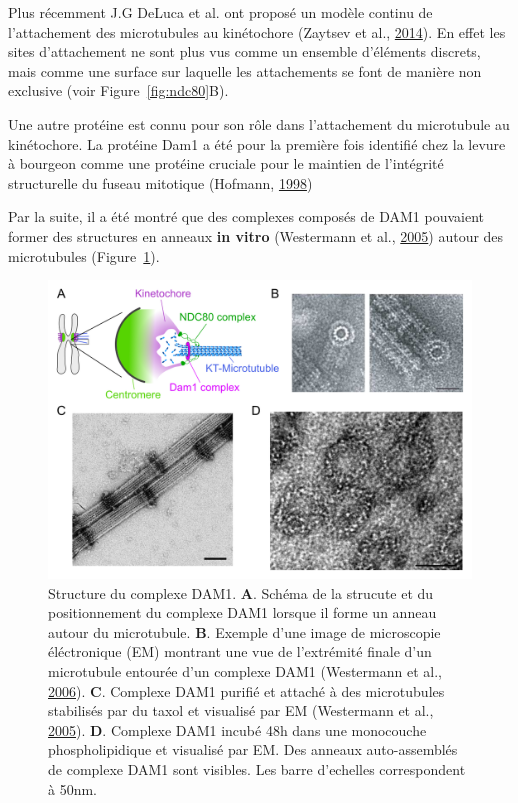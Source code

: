 \documentclass[12pt,a4paper,twoside,openright]{book}
\begin{document}
Plus récemment J.G DeLuca et al. ont proposé un modèle continu de
l'attachement des microtubules au kinétochore (Zaytsev et al.,
\protect\hyperlink{ref-Zaytsev2014}{2014}). En effet les sites
d'attachement ne sont plus vus comme un ensemble d'éléments discrets,
mais comme une surface sur laquelle les attachements se font de manière
non exclusive (voir Figure~\ref{fig:ndc80}B).

Une autre protéine est connu pour son rôle dans l'attachement du
microtubule au kinétochore. La protéine Dam1 a été pour la première fois
identifié chez la levure à bourgeon comme une protéine cruciale pour le
maintien de l'intégrité structurelle du fuseau mitotique (Hofmann,
\protect\hyperlink{ref-Hofmann1998}{1998})

Par la suite, il a été montré que des complexes composés de DAM1
pouvaient former des structures en anneaux \textbf{in vitro} (Westermann
et al., \protect\hyperlink{ref-Westermann2005}{2005}) autour des
microtubules (Figure~\ref{fig:dam1-struct}).

\begin{figure}[htbp]
\centering
\includegraphics{figures/intro/dam1-struct.png}
\caption[Structure du complexe DAM1]{\label{fig:dam1-struct}Structure du
complexe DAM1. \textbf{A}. Schéma de la strucute et du positionnement du
complexe DAM1 lorsque il forme un anneau autour du microtubule.
\textbf{B}. Exemple d'une image de microscopie éléctronique (EM)
montrant une vue de l'extrémité finale d'un microtubule entourée d'un
complexe DAM1 (Westermann et al.,
\protect\hyperlink{ref-Westermann2006}{2006}). \textbf{C}. Complexe DAM1
purifié et attaché à des microtubules stabilisés par du taxol et
visualisé par EM (Westermann et al.,
\protect\hyperlink{ref-Westermann2005}{2005}). \textbf{D}. Complexe DAM1
incubé 48h dans une monocouche phospholipidique et visualisé par EM. Des
anneaux auto-assemblés de complexe DAM1 sont visibles. Les barre
d'echelles correspondent à 50nm.}
\end{figure}
\end{document}
